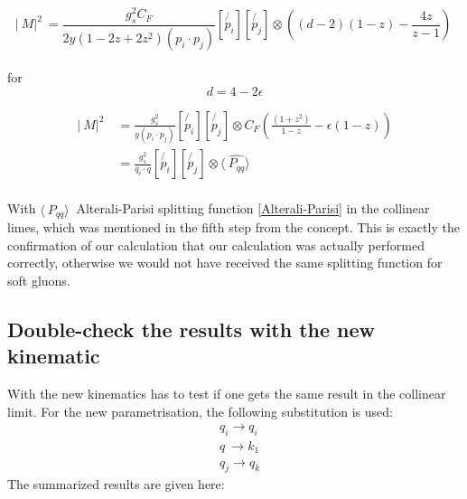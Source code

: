 \begin{equation}
\lvert\:M\lvert^2\: = \frac{g_s^2 C_F}{2y(1-2z+2z^2)(p_i \cdot p_j)}[\not{p_i}][\not{p_j}] \otimes((d-2)(1-z)-\frac{4z}{z-1})\:
\end{equation}
\\
for
\begin{equation}
d=4-2\epsilon
\end{equation}

\begin{equation}
\begin{split}
\lvert\:M\lvert^2\: &=\frac{g_s^2}{y(p_i \cdot p_j)}[\not{p_i}][\not{p_j}]\otimes C_F(\frac{(1+z^2)}{1-z}-\epsilon(1-z))\\
&=\frac{g_s^2}{q_i \cdot q}[\not{p_i}][\not{p_j}]\otimes \langle\:\hat{P_{qq}}\rangle\:\\
\end{split}
\end{equation}

With $ \langle\:\hat{P_{qq}}\rangle\: $ Alterali-Parisi splitting function \ref{Alterali-Parisi}  in the collinear limes, which was mentioned in the fifth step from the concept. This is exactly the confirmation of our calculation that our calculation was actually performed correctly, otherwise we would not have received the same splitting function for soft gluons.
\newpage

\subsection{Double-check the results with the new kinematic}
With the new kinematics has to test if one gets the same result in the collinear limit. For the new parametrisation, the following substitution is used:
\begin{equation}
\begin{split}
&q_i \rightarrow q_i\\
&q \: \rightarrow k_1\\
&q_j \rightarrow q_k
\end{split}
\end{equation}
The summarized results are given here: 
